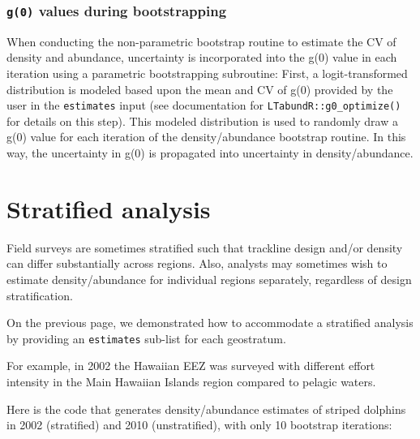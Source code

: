\documentclass[
]{book}
\begin{document}
\hypertarget{g0-values-during-bootstrapping}{%
\subsection*{\texorpdfstring{\texttt{g(0)} values during bootstrapping}{g(0) values during bootstrapping}}\label{g0-values-during-bootstrapping}}

When conducting the non-parametric bootstrap routine to estimate the CV of density and abundance, uncertainty is incorporated into the g(0) value in each iteration using a parametric bootstrapping subroutine: First, a logit-transformed distribution is modeled based upon the mean and CV of g(0) provided by the user in the \texttt{estimates} input (see documentation for \texttt{LTabundR::g0\_optimize()} for details on this step). This modeled distribution is used to randomly draw a g(0) value for each iteration of the density/abundance bootstrap routine. In this way, the uncertainty in g(0) is propagated into uncertainty in density/abundance.

\hypertarget{destratify}{%
\chapter{Stratified analysis}\label{destratify}}

Field surveys are sometimes stratified such that trackline design and/or density can differ substantially across regions. Also, analysts may sometimes wish to estimate density/abundance for individual regions separately, regardless of design stratification.

On the previous page, we demonstrated how to accommodate a stratified analysis by providing an \texttt{estimates} sub-list for each geostratum.

For example, in 2002 the Hawaiian EEZ was surveyed with different effort intensity in the Main Hawaiian Islands region compared to pelagic waters.

Here is the code that generates density/abundance estimates of striped dolphins in 2002 (stratified) and 2010 (unstratified), with only 10 bootstrap iterations:
\end{document}

